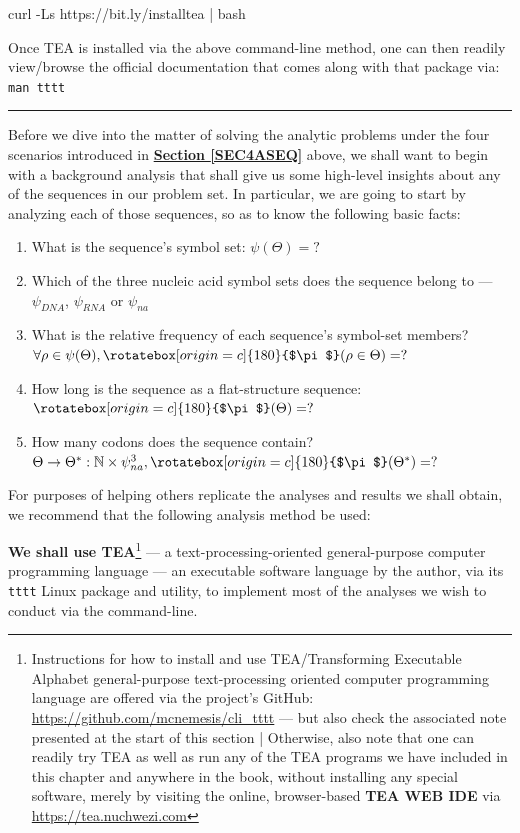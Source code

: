 \documentclass[a4paper, 18pt]{book} %
\newcommand{\invpi}{\rotatebox[origin=c]{180}{$\pi$}}
\begin{document}
{\begin{enumerate}
    \begin{tcbverbatim}[title=UNIX/Linux TEA installation command]
curl -Ls https://bit.ly/installtea | bash
  \end{tcbverbatim}
\end{enumerate}

Once TEA is installed via the above command-line method, one can then readily view/browse the official documentation that comes along with that package via: \texttt{man tttt}

}

\noindent\rule{\textwidth}{0.4pt}
\vspace{2em}



Before we dive into the matter of solving the analytic problems under the four scenarios introduced in \textbf{\hyperref[SEC4ASEQ]{Section \ref{SEC4ASEQ}}} above, we shall want to begin with a background analysis that shall give us some high-level insights about any of the sequences in our problem set. In particular, we are going to start by analyzing each of those sequences, so as to know the following basic facts:

\begin{enumerate}
\item What is the sequence's symbol set: $\psi(\Theta) = ?$
\item Which of the three nucleic acid symbol sets does the sequence belong to --- $\psi_{DNA}$, $\psi_{RNA}$ or $\psi_{na}$
\item What is the relative frequency of each sequence's symbol-set members? $\forall \rho \in \psi(\Theta), \invpi(\rho \in \Theta) = ?$
\item How long is the sequence as a flat-structure sequence: $\invpi(\Theta) = ?$
\item How many codons does the sequence contain? $\Theta \rightarrow \Theta^*: \mathbb{N} \times \psi_{na}^3, \invpi(\Theta^*) = ?$
\end{enumerate}

For purposes of helping others replicate the analyses and results we shall obtain, we recommend that the following analysis method be used: 


\textbf{We shall use TEA}\footnote{Instructions for how to install and use TEA/Transforming Executable Alphabet general-purpose text-processing oriented computer programming language are offered via the project's GitHub: \url{https://github.com/mcnemesis/cli_tttt} --- but also check the associated note presented at the start of this section | Otherwise, also note that one can readily try TEA as well as run any of the TEA programs we have included in this chapter and anywhere in the book, without installing any special software, merely by visiting the online, browser-based \textbf{TEA WEB IDE} via \url{https://tea.nuchwezi.com}}\cite{Lutalo2024_taz}\cite{cli_tttt} --- a text-processing-oriented general-purpose computer programming language --- an executable software language by the author, via its \texttt{tttt} Linux package and utility, to implement most of the analyses we wish to conduct via the command-line.
\end{document}
